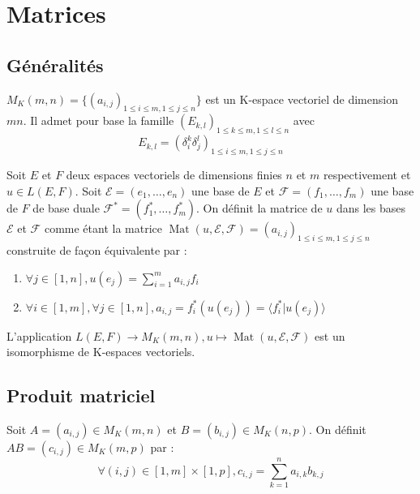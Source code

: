 \section{Matrices}

\subsection{Généralités}

\begin{de}
$M_K(m,n) = \{(a_{i,j})_{1\leq i\leq m,1\leq j\leq n}\}$ est un K-espace vectoriel de dimension $mn$. Il admet pour base la famille $(E_{k,l})_{1\leq k\leq m,1\leq l\leq n}$ avec 
\[ E_{k,l} = (\delta_i^k\delta_j^l)_{1\leq i\leq m,1\leq j\leq n} \]
\end{de}

\begin{de}
Soit $E$ et $F$ deux espaces vectoriels de dimensions finies $n$ et $m$ respectivement et $u \in L(E,F)$. Soit $\mathcal{E} = (e_1,\ldots,e_n)$ une base de $E$ et $\mathcal{F} = (f_1,\ldots,f_m)$ une base de $F$ de base duale $\mathcal{F}^* = (f_1^*,\ldots,f_m^*)$. On définit la matrice de $u$ dans les bases $\mathcal{E}$ et $\mathcal{F}$ comme étant la matrice $\operatorname{Mat}(u,\mathcal{E},\mathcal{F}) = (a_{i,j})_{1\leq i\leq m,1\leq j\leq n}$ construite de façon équivalente par :
\begin{enumerate}
\item $\forall j \in [1,n], u(e_j) = \sum_{i=1}^m a_{i,j}f_i$ 
\item $\forall i \in [1,m], \forall j \in [1,n], a_{i,j} = f_i^*(u(e_j)) = \langle f_i^*|u(e_j)\rangle$
\end{enumerate}
\end{de}

\begin{prop}
L'application $L(E,F) \to M_K(m,n), u \mapsto \operatorname{Mat}(u,\mathcal{E},\mathcal{F})$ est un isomorphisme de K-espaces vectoriels.
\end{prop}

\subsection{Produit matriciel}

Soit $A = (a_{i,j}) \in M_K(m,n)$ et $B = (b_{i,j}) \in M_K(n,p)$. On définit $AB = (c_{i,j}) \in M_K(m,p)$ par :
\[ \forall (i,j) \in [1,m] \times [1,p], c_{i,j} = \sum_{k=1}^n a_{i,k}b_{k,j} \]

